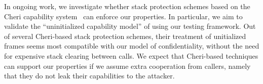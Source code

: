\documentclass[acmtog,review,anonymous]{acmart}\settopmatter{printfolios=true,printccs=false,printacmref=false}
\begin{document}
In ongoing work, we investigate whether stack protection schemes
based on the Cheri capability system~\citep{Woodruff+14,Chisnall+15}
can enforce our properties.  In particular, we aim to validate
the ``uninitialized capability model'' of \citet{Georges+21} using
our testing framework. Out of several Cheri-based
stack protection schemes, their treatment of unitialized frames seems most compatible
with our model of confidentiality, without the need for expensive stack clearing
between calls. We expect that Cheri-based techniques can support our properties if we
assume extra cooperation from callers, namely that they do not leak their capabilities
to the attacker. %



\end{document}
